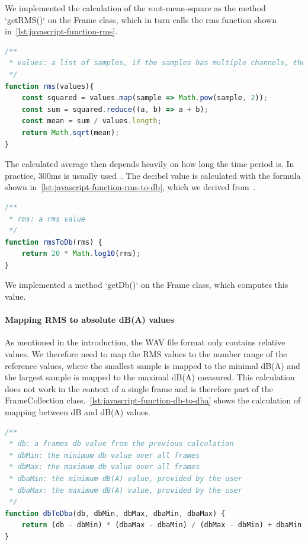 We implemented the calculation of the root-mean-square as the method `getRMS()` on the Frame class,
which in turn calls the rms function shown in~\autoref{lst:javascript-function-rms}.

\begin{lstlisting}[caption={JavaScript RMS function},label={lst:javascript-function-rms},language=JavaScript]
/**
 * values: a list of samples, if the samples has multiple channels, they need to be averaged beforehand
 */
function rms(values){
    const squared = values.map(sample => Math.pow(sample, 2));
    const sum = squared.reduce((a, b) => a + b);
    const mean = sum / values.length;
    return Math.sqrt(mean);
}
\end{lstlisting}

The calculated average then depends heavily on how long the time period is.
In practice, 300ms is usually used~\cite{timespan_for_audio_rms_calculate}.
The decibel value is calculated with the formula shown in~\autoref{lst:javascript-function-rms-to-db}, which we derived from~\cite{decibel_wikipedia}.

\begin{lstlisting}[caption={JavaScript RMS to DB function},label={lst:javascript-function-rms-to-db},language=JavaScript]
/**
 * rms: a rms value
 */
function rmsToDb(rms) {
    return 20 * Math.log10(rms);
}
\end{lstlisting}

We implemented a method `getDb()` on the Frame class, which computes this value.

\paragraph{Mapping RMS to absolute dB(A) values}
As mentioned in the introduction, the WAV file format only contains relative values.
We therefore need to map the RMS values to the number range of the reference values,
where the smallest sample is mapped to the minimal dB(A) and the largest sample is mapped to the maximal dB(A) measured.
This calculation does not work in the context of a single frame and is therefore part of the FrameCollection class.~\autoref{lst:javascript-function-db-to-dba} shows the calculation of mapping between dB and dB(A) values. 

\begin{lstlisting}[caption={JavaScript DB to DBA function},label={lst:javascript-function-db-to-dba},language=JavaScript]
/**
 * db: a frames db value from the previous calculation
 * dbMin: the minimum db value over all frames
 * dbMax: the maximum db value over all frames
 * dbaMin: the minimum dB(A) value, provided by the user
 * dbaMax: the maximum dB(A) value, provided by the user
 */
function dbToDba(db, dbMin, dbMax, dbaMin, dbaMax) {
    return (db - dbMin) * (dbaMax - dbaMin) / (dbMax - dbMin) + dbaMin;
}
\end{lstlisting}

